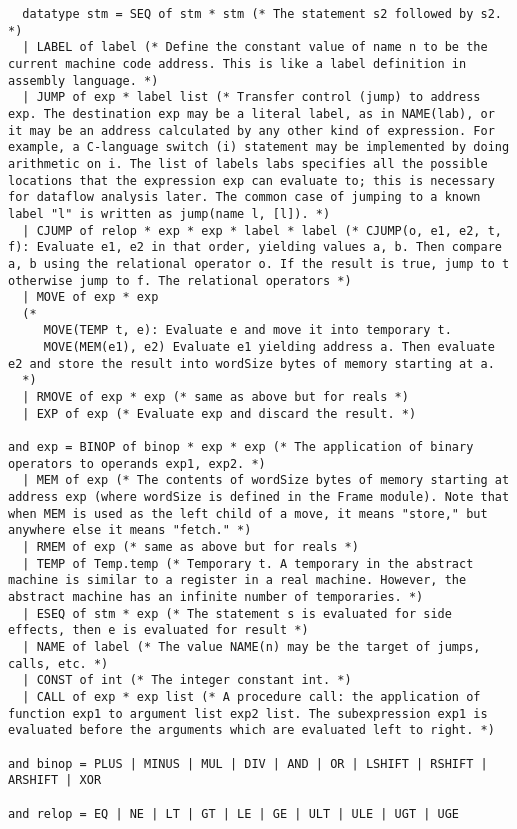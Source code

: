 \begin{verbatim}
  datatype stm = SEQ of stm * stm (* The statement s2 followed by s2. *)
  | LABEL of label (* Define the constant value of name n to be the current machine code address. This is like a label definition in assembly language. *)
  | JUMP of exp * label list (* Transfer control (jump) to address exp. The destination exp may be a literal label, as in NAME(lab), or it may be an address calculated by any other kind of expression. For example, a C-language switch (i) statement may be implemented by doing arithmetic on i. The list of labels labs specifies all the possible locations that the expression exp can evaluate to; this is necessary for dataflow analysis later. The common case of jumping to a known label "l" is written as jump(name l, [l]). *)
  | CJUMP of relop * exp * exp * label * label (* CJUMP(o, e1, e2, t, f): Evaluate e1, e2 in that order, yielding values a, b. Then compare a, b using the relational operator o. If the result is true, jump to t otherwise jump to f. The relational operators *)
  | MOVE of exp * exp 
  (*
     MOVE(TEMP t, e): Evaluate e and move it into temporary t. 
     MOVE(MEM(e1), e2) Evaluate e1 yielding address a. Then evaluate e2 and store the result into wordSize bytes of memory starting at a.
  *)
  | RMOVE of exp * exp (* same as above but for reals *)
  | EXP of exp (* Evaluate exp and discard the result. *)

and exp = BINOP of binop * exp * exp (* The application of binary operators to operands exp1, exp2. *)
  | MEM of exp (* The contents of wordSize bytes of memory starting at address exp (where wordSize is defined in the Frame module). Note that when MEM is used as the left child of a move, it means "store," but anywhere else it means "fetch." *)
  | RMEM of exp (* same as above but for reals *)
  | TEMP of Temp.temp (* Temporary t. A temporary in the abstract machine is similar to a register in a real machine. However, the abstract machine has an infinite number of temporaries. *)
  | ESEQ of stm * exp (* The statement s is evaluated for side effects, then e is evaluated for result *)
  | NAME of label (* The value NAME(n) may be the target of jumps, calls, etc. *)
  | CONST of int (* The integer constant int. *)
  | CALL of exp * exp list (* A procedure call: the application of function exp1 to argument list exp2 list. The subexpression exp1 is evaluated before the arguments which are evaluated left to right. *)

and binop = PLUS | MINUS | MUL | DIV | AND | OR | LSHIFT | RSHIFT | ARSHIFT | XOR

and relop = EQ | NE | LT | GT | LE | GE | ULT | ULE | UGT | UGE
\end{verbatim}

